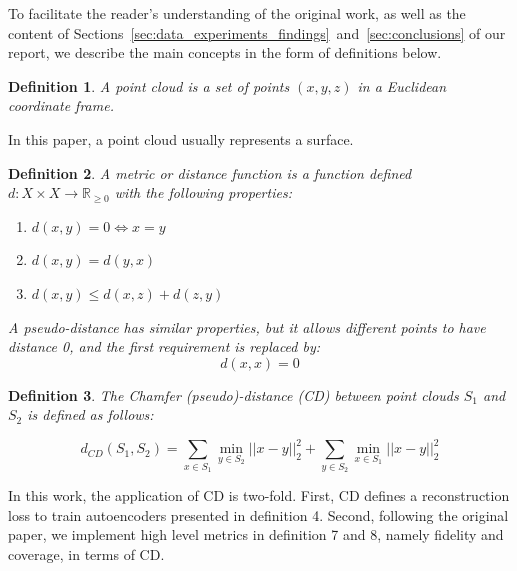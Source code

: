 \documentclass[12pt]{article}
\newtheorem{definition}{Definition}
\begin{document}
    To facilitate the reader's understanding of the original work, as well as the content of Sections~\ref{sec:data_experiments_findings}~and~\ref{sec:conclusions} of our report, we describe the main concepts in the form of definitions below.

    \begin{definition}
        \normalfont
        A \emph{point cloud} is a set of points $(x, y, z)$ in a Euclidean coordinate frame.
    \end{definition}

    In this paper, a point cloud usually represents a surface.

    \begin{definition}
        \normalfont
        A \emph{metric} or \emph{distance function} is a function defined
        $d: X \times X \to \mathbb{R}_{\geq 0}$
        with the following properties:

        \begin{enumerate}
            \item $d(x,y) = 0 \Leftrightarrow x = y$
            \item $d(x,y) = d(y,x)$
            \item $d(x,y) \leq d(x,z) + d(z,y)$
        \end{enumerate}

        A \emph{pseudo-distance} has similar properties, but it allows different points to have distance 0, and the first requirement is replaced by:
        \[d(x,x) = 0\]
    \end{definition}

    \begin{definition}
        \normalfont
        The \emph{Chamfer (pseudo)-distance (CD)} between point clouds $S_1$ and $S_2$ is defined as follows:

        \begin{equation}
            d_{CD}(S_{1}, S_{2}) =
            \sum_{x \in S_{1}} \min _{y \in S_{2}} || x - y||_{2}^{2} + \sum_{y \in S_{2}} \min_{x \in S_{1}} ||x - y||_{2}^{2}
            \label{equation:chamfer_distance}
        \end{equation}

    \end{definition}


    In this work, the application of CD is two-fold. First, CD defines a reconstruction loss to train autoencoders presented in definition 4. Second, following the original paper, we implement high level metrics in definition 7 and 8, namely fidelity and coverage, in terms of CD.
\end{document}
